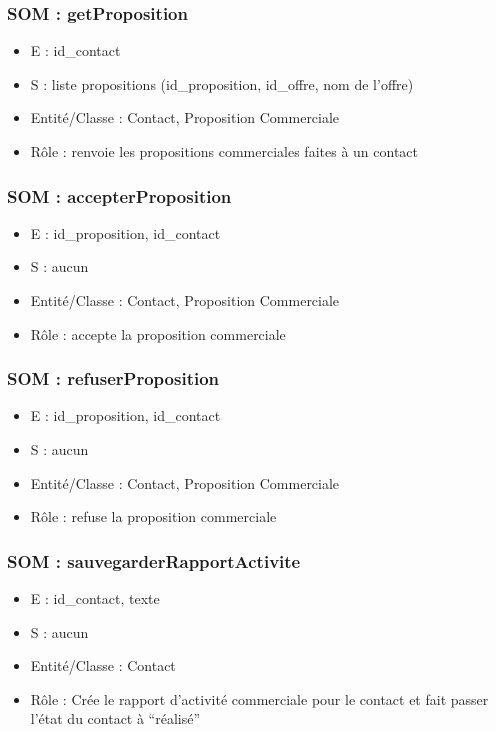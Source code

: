 \subsubsection{SOM : getProposition}
	\begin{itemize}
		\item E : id\_contact
		\item S : liste propositions (id\_proposition, id\_offre, nom de l’offre)
		\item Entité/Classe : Contact, Proposition Commerciale
		\item Rôle : renvoie les propositions commerciales faites à un contact
	\end{itemize}

\subsubsection{SOM : accepterProposition}
	\begin{itemize}
		\item E : id\_proposition, id\_contact
		\item S : aucun
		\item Entité/Classe : Contact, Proposition Commerciale
		\item Rôle : accepte la proposition commerciale
	\end{itemize}

\subsubsection{SOM : refuserProposition}
	\begin{itemize}
		\item E : id\_proposition, id\_contact
		\item S : aucun
		\item Entité/Classe : Contact, Proposition Commerciale
		\item Rôle : refuse la proposition commerciale
	\end{itemize}

\subsubsection{SOM : sauvegarderRapportActivite}
	\begin{itemize}
		\item E : id\_contact, texte
		\item S : aucun
		\item Entité/Classe : Contact
		\item Rôle : Crée le rapport d’activité commerciale pour le contact et fait passer l’état du
	contact à “réalisé”
	\end{itemize}




